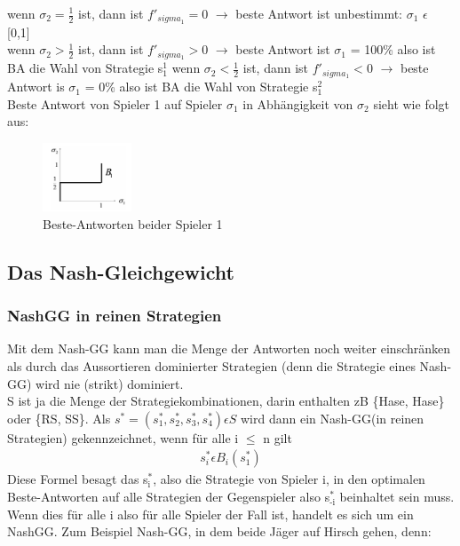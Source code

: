 \documentclass[11pt]{article}
\begin{document}
wenn \(\sigma_2 = \frac{1}{2}\) ist, dann ist \(f'_{sigma_1}=0\) \(\rightarrow\) beste Antwort ist unbestimmt: \(\sigma_{\text{1}}\) \(\epsilon\) [0,1]\\
wenn \(\sigma_2 > \frac{1}{2}\) ist, dann ist \(f'_{sigma_1}>0\) \(\rightarrow\) beste Antwort ist \(\sigma_{\text{1}}\) = 100\% also ist BA die Wahl von Strategie s\(^{\text{1}}_{\text{1}}\)
wenn \(\sigma_2 < \frac{1}{2}\) ist, dann ist \(f'_{sigma_1}<0\) \(\rightarrow\) beste Antwort is \(\sigma_{\text{1}}\) = 0\% also ist BA die Wahl von Strategie s\(^{\text{2}}_{\text{1}}\)\\
\newpage
Beste Antwort von Spieler 1 auf Spieler \(\sigma_{\text{1}}\) in Abhängigkeit von \(\sigma_{\text{2}}\) sieht wie folgt aus:
\begin{figure}[htbp]
\centering
\includegraphics[width=100px]{./Kop_Zahl_BA.png}
\caption{Beste-Antworten beider Spieler 1}
\end{figure}
\subsection{Das Nash-Gleichgewicht}
\label{sec:org3534a51}
\subsubsection{NashGG in reinen Strategien}
\label{sec:org353abc6}
Mit dem Nash-GG kann man die Menge der Antworten noch weiter einschränken als durch das Aussortieren dominierter Strategien (denn die Strategie eines Nash-GG) wird nie (strikt) dominiert.\\
S ist ja die Menge der Strategiekombinationen, darin enthalten zB \{Hase, Hase\} oder \{RS, SS\}. Als \(s^* = (s^*_1, s^*_2, s^*_3, s^*_4) \epsilon S\) wird dann ein Nash-GG(in reinen Strategien) gekennzeichnet, wenn für alle i \(\le\) n gilt \\
\begin{equation*}
\begin{aligned}
s^*_i \epsilon B_i(s^*_1)
\end{aligned}
\end{equation*}
Diese Formel besagt das s\(^{\text{*}}_{\text{i}}\), also die Strategie von Spieler i, in den optimalen Beste-Antworten auf alle Strategien der Gegenspieler also s\(^{\text{*}}_{\text{-i}}\) beinhaltet sein muss. Wenn dies für alle i also für alle Spieler der Fall ist, handelt es sich um ein NashGG. Zum Beispiel Nash-GG, in dem beide Jäger auf Hirsch gehen, denn:
\end{document}
